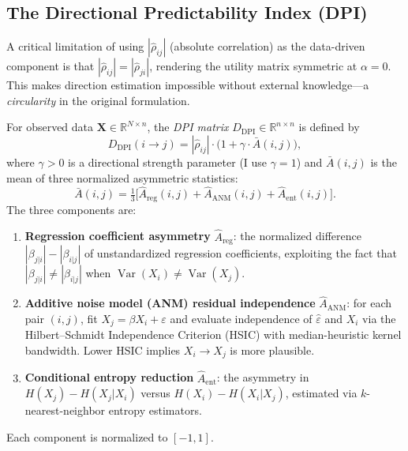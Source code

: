 \documentclass[twoside,11pt]{article}
\DeclareMathOperator{\Var}{Var}
\newcommand{\R}{\mathbb{R}}
\newcommand{\DPI}{\mathrm{DPI}}
\begin{document}
\subsection{The Directional Predictability Index (DPI)}
\label{sec:dpi}

A critical limitation of using $|\hat\rho_{ij}|$ (absolute correlation)
as the data-driven component is that $|\hat\rho_{ij}|=|\hat\rho_{ji}|$,
rendering the utility matrix symmetric at $\alpha=0$.  This makes
direction estimation impossible without external knowledge---a
\emph{circularity} in the original formulation.

\begin{definition}
\label{def:dpi}
For observed data $\mathbf{X}\in\R^{N\times n}$, the \emph{DPI matrix}
$D_{\DPI}\in\R^{n\times n}$ is defined by
\begin{equation}
\label{eq:dpi}
  D_{\DPI}(i\to j) = |\hat\rho_{ij}|\cdot
    \bigl(1+\gamma\cdot\bar{A}(i,j)\bigr),
\end{equation}
where $\gamma>0$ is a directional strength parameter (I use $\gamma=1$)
and $\bar{A}(i,j)$ is the mean of three normalized asymmetric statistics:
\begin{equation}
\label{eq:abar}
  \bar{A}(i,j) = \tfrac{1}{3}\bigl[
    \hat{A}_{\mathrm{reg}}(i,j)
    + \hat{A}_{\mathrm{ANM}}(i,j)
    + \hat{A}_{\mathrm{ent}}(i,j)
  \bigr].
\end{equation}
The three components are:
\begin{enumerate}
\item[\emph{(i)}] \textbf{Regression coefficient asymmetry}
  $\hat{A}_{\mathrm{reg}}$: the normalized difference
  $|\beta_{j|i}|-|\beta_{i|j}|$ of unstandardized regression
  coefficients, exploiting the fact that
  $|\beta_{j|i}|\ne|\beta_{i|j}|$ when $\Var(X_i)\ne\Var(X_j)$.
\item[\emph{(ii)}] \textbf{Additive noise model (ANM) residual independence}
  $\hat{A}_{\mathrm{ANM}}$: for each pair $(i,j)$, fit
  $X_j=\beta X_i+\varepsilon$ and evaluate independence of
  $\hat\varepsilon$ and $X_i$ via the Hilbert--Schmidt Independence
  Criterion (HSIC) with median-heuristic kernel bandwidth.  Lower HSIC
  implies $X_i\to X_j$ is more plausible.
\item[\emph{(iii)}] \textbf{Conditional entropy reduction}
  $\hat{A}_{\mathrm{ent}}$: the asymmetry in
  $H(X_j)-H(X_j|X_i)$ versus $H(X_i)-H(X_i|X_j)$, estimated via
  $k$-nearest-neighbor entropy estimators.
\end{enumerate}
Each component is normalized to $[-1,1]$.
\end{definition}
\end{document}
